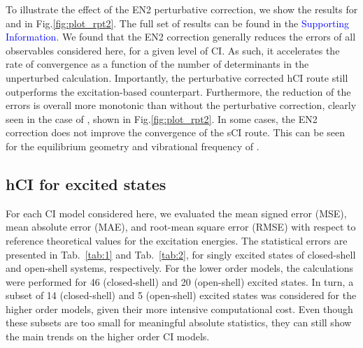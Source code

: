 \documentclass[aip,jcp,reprint,noshowkeys,superscriptaddress]{revtex4-1}
\newcommand{\SupInf}{\textcolor{blue}{Supporting Information}}
\begin{document}
To illustrate the effect of the EN2 perturbative correction, we show the results for  and  in Fig.\ref{fig:plot_rpt2}.
The full set of results can be found in the \SupInf.
We found that the EN2 correction generally reduces the errors of all observables considered here, for a given level of CI.
As such, it accelerates the rate of convergence as a function of the number of determinants in the unperturbed calculation.
Importantly, the perturbative corrected hCI route still outperforms the excitation-based counterpart.
Furthermore, the reduction of the errors is overall more monotonic than without the perturbative correction,
clearly seen in the case of , shown in Fig.\ref{fig:plot_rpt2}.
In some cases, the EN2 correction does not improve the convergence of the sCI route.
This can be seen for the equilibrium geometry and vibrational frequency of .




 


\subsection{hCI for excited states}
\label{sec:res_B}


For each CI model considered here, we evaluated the mean signed error (MSE), mean absolute error (MAE), and root-mean square error (RMSE) 
with respect to reference theoretical values for the excitation energies.
The statistical errors are presented in Tab.~\ref{tab:1} and Tab.~\ref{tab:2},
for singly excited states of closed-shell and open-shell systems, respectively.
For the lower order models, the calculations were performed for 46 (closed-shell) and 20 (open-shell) excited states.
In turn, a subset of 14 (closed-shell) and 5 (open-shell) excited states was considered for the higher order models, given their more intensive computational cost.
Even though these subsets are too small for meaningful absolute statistics, they can still show the main trends on the higher order CI models.
\end{document}
